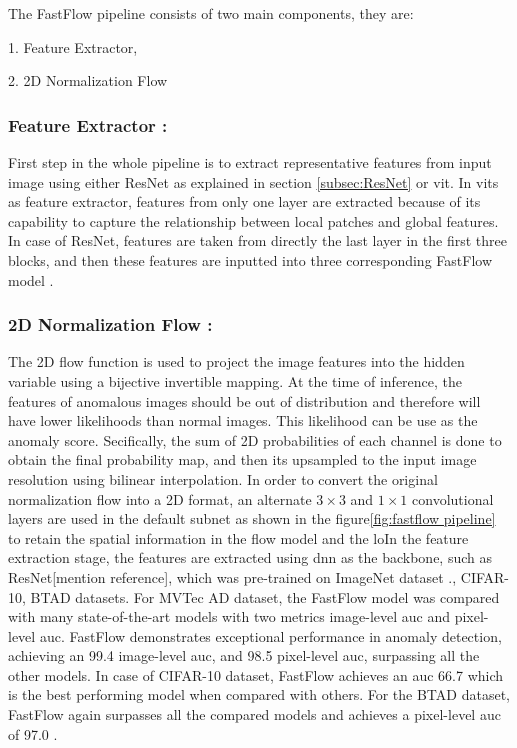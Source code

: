 The FastFlow pipeline consists of two main components, they are:

1. Feature Extractor,

2. 2D Normalization Flow

\subsubsection*{Feature Extractor :}

First step in the whole pipeline is to extract representative features from input image using either ResNet as explained in section \ref{subsec:ResNet} or \gls{vit}. In \glspl{vit} as feature extractor, features from only one layer are extracted because of its capability to capture the relationship between local patches and global features. In case of ResNet, features are taken from directly the last layer in the first three blocks, and then these features are inputted into three corresponding FastFlow model \cite{yu2021fastflowunsupervisedanomalydetection}. 

\subsubsection*{2D Normalization Flow :}

The 2D flow function is used to project the image features into the hidden variable using a bijective invertible mapping. At the time of inference, the features of anomalous images should be out of distribution and therefore will have lower likelihoods than normal images. This likelihood can be use as the anomaly score. Secifically, the sum of 2D probabilities of each channel is done to obtain the final probability map, and then its upsampled to the input image resolution using bilinear interpolation. In order to convert the original normalization flow into a 2D format, an alternate $3\times3$ and $1\times1$ convolutional layers are used in the default subnet as shown in the figure\ref{fig:fastflow pipeline} to retain the spatial information in the flow model and the loIn the feature extraction stage, the features are extracted using \gls{dnn} as the backbone, such as ResNet[mention reference], which was pre-trained on ImageNet\cite{5206848} dataset \cite{10208786}., CIFAR-10\cite{krizhevsky2009learning}, BTAD\cite{Mishra_2021} datasets. For MVTec AD dataset, the FastFlow model was compared with many state-of-the-art models with two metrics image-level \gls{auc} and pixel-level \gls{auc}. FastFlow demonstrates exceptional performance in anomaly detection, achieving an 99.4 image-level \gls{auc}, and 98.5 pixel-level \gls{auc}, surpassing all the other models. In case of CIFAR-10 dataset, FastFlow achieves an \gls{auc} 66.7 which is the best performing model when compared with others. For the BTAD dataset, FastFlow again surpasses all the compared models and achieves a pixel-level \gls{auc} of 97.0 \cite{yu2021fastflowunsupervisedanomalydetection}.

